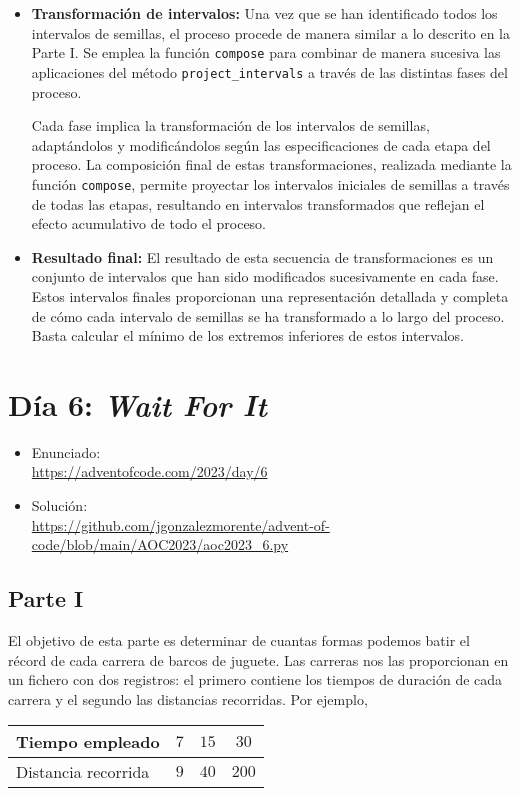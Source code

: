 \documentclass[a4paper,12pt]{article}
\begin{document}
\begin{enumerate}
\begin{itemize}
        \item \textbf{Transformación de intervalos:}
        Una vez que se han identificado todos los intervalos de semillas, el proceso procede de manera similar a lo descrito en la Parte I. Se emplea la función \lstinline{compose} para combinar de manera sucesiva las aplicaciones del método \lstinline{project_intervals} a través de las distintas fases del proceso.
    
        Cada fase implica la transformación de los intervalos de semillas, adaptándolos y modificándolos según las especificaciones de cada etapa del proceso. La composición final de estas transformaciones, realizada mediante la función \lstinline{compose}, permite proyectar los intervalos iniciales de semillas a través de todas las etapas, resultando en intervalos transformados que reflejan el efecto acumulativo de todo el proceso.
    
        \item \textbf{Resultado final:}
        El resultado de esta secuencia de transformaciones es un conjunto de intervalos que han sido modificados sucesivamente en cada fase. Estos intervalos finales proporcionan una representación detallada y completa de cómo cada intervalo de semillas se ha transformado a lo largo del proceso. Basta calcular el mínimo de los extremos inferiores de estos intervalos.
    \end{itemize}
\end{enumerate}

\section{Día 6: \textnormal{ \it Wait For It}}
\begin{itemize}
    \item Enunciado: \\
    \href{https://adventofcode.com/2023/day/5}{https://adventofcode.com/2023/day/6}
    \item Solución: \\ 
    \href{https://github.com/jgonzalezmorente/advent-of-code/blob/main/AOC2023/aoc2023_6.py}{https://github.com/jgonzalezmorente/advent-of-code/blob/main/AOC2023/aoc2023\_6.py}
\end{itemize}
\subsection{Parte I}
El objetivo de esta parte es determinar de cuantas formas podemos batir el récord de cada carrera de barcos de juguete. Las carreras nos las proporcionan en un fichero con dos registros: el primero contiene los tiempos de duración de cada carrera y el segundo las distancias recorridas. Por ejemplo,
\begin{table}[ht]
    \centering
    \begin{tabular}{|l|c|c|c|}
    \hline
    Tiempo empleado     & $7$ & $15$ & $30$ \\ \hline
    Distancia recorrida & $9$ & $40$ & $200$ \\ \hline
    \end{tabular}
\end{table}
\end{document}
